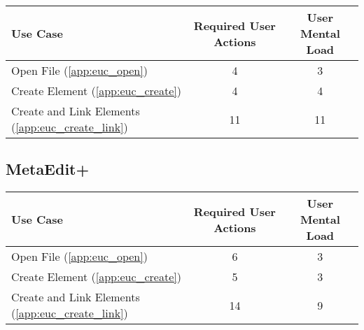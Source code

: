 \begin{tabularx}{\textwidth}{Xcc}
\textbf{Use Case} & \textbf{Required User Actions} & \textbf{User Mental Load}\\
\hline
Open File (\ref{app:euc_open})                       & 4  & 3 \\
Create Element (\ref{app:euc_create})                & 4  & 4 \\
Create and Link Elements (\ref{app:euc_create_link}) & 11 & 11
\end{tabularx}

\subsection*{MetaEdit+}




\begin{tabularx}{\textwidth}{Xcc}
\textbf{Use Case} & \textbf{Required User Actions} & \textbf{User Mental Load}\\
\hline
Open File (\ref{app:euc_open})                       & 6 & 3 \\
Create Element (\ref{app:euc_create})                & 5 & 3 \\
Create and Link Elements (\ref{app:euc_create_link}) & 14 & 9
\end{tabularx}


